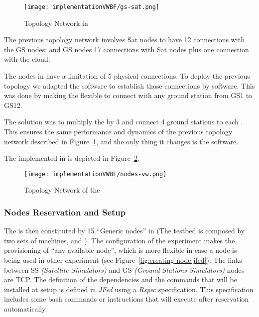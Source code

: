 \begin{figure}[!h]
\hspace{-1cm}
\begin{center}
\texttt{[image: implementationVWBF/gs-sat.png]}

\caption{Topology Network in \vw}
\label{fig:impl-topology-vw}
\end{center}
\end{figure}



The previous topology network involves Sat nodes to have 12 connections with the GS nodes; and GS nodes 17 connections with Sat nodes plus one connection with the \bonfire cloud.

The nodes in \vw have a limitation of 5 physical connections. To deploy the previous
topology we adapted the \sss software to establish those connections by software. This was
done by making the \satss flexible to connect with any ground station from GS1 to GS12. 

The solution was to multiply the \satss by 3 and connect 4 ground stations to each \satss. This ensures the same performance and dynamics of the previous topology network described in Figure~\ref{fig:impl-topology-vw}, and the only thing it changes is the software.

The \sss implemented in \vw is depicted in Figure~\ref{fig:impl-nodes-vw}.

\begin{figure}[!h]
\begin{center}
\texttt{[image: implementationVWBF/nodes-vw.png]}

\caption{Topology Network of the \satss}
\label{fig:impl-nodes-vw}
\end{center}
\end{figure}



\subsubsection{Nodes Reservation and Setup}

The \sss is then constituted by 15 ``Generic nodes'' in  (The \vw
testbed is composed by two sets of machines,  and ). The configuration of the experiment makes the provisioning of ``any available node'',
which is more flexible in case a node is being used in other experiment (see Figure~\ref{fig:creating-node-jfed}). The links between SS \emph{(Satellite Simulators)} and GS \emph{(Ground Stations Simulators)} nodes
are \ac{TCP}. The definition of the dependencies and the commands that will be installed at
setup is defined in \emph{JFed} using a \emph{Rspec} specification. This specification includes some
bash commands or instructions that will execute after reservation automatically.


